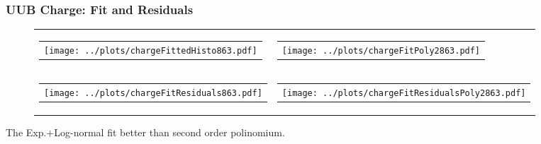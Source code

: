 \documentclass[aspectratio=169]{beamer}
\begin{document}
\begin{frame}
  \frametitle{UUB Charge: Fit and Residuals}
  \begin{figure}
    \centering
    \begin{tabularx}{\textwidth}{CC}
      \begin{tabular}{l}
        \texttt{[image: ../plots/chargeFittedHisto863.pdf]}
      \end{tabular}
      &
      \begin{tabular}{l}
        \texttt{[image: ../plots/chargeFitPoly2863.pdf]}
      \end{tabular}
      \\
      \begin{tabular}{l}
        \texttt{[image: ../plots/chargeFitResiduals863.pdf]}
      \end{tabular}
      &
      \begin{tabular}{l}
        \texttt{[image: ../plots/chargeFitResidualsPoly2863.pdf]}
      \end{tabular}
    \end{tabularx}
  \end{figure}
  The Exp.+Log-normal fit better than second order polinomium.
\end{frame}


\end{document}
